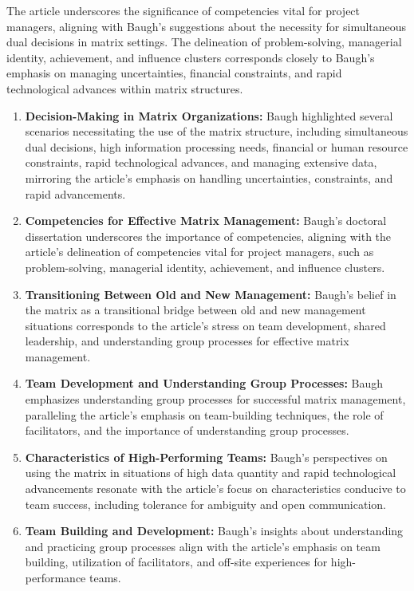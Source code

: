 \documentclass[runningheads]{llncs}
\begin{document}
The article underscores the significance of competencies vital for project managers, aligning with Baugh's suggestions about the necessity for simultaneous dual decisions in matrix settings. The delineation of problem-solving, managerial identity, achievement, and influence clusters corresponds closely to Baugh's emphasis on managing uncertainties, financial constraints, and rapid technological advances within matrix structures.
\begin{enumerate}
    \item \textbf{Decision-Making in Matrix Organizations:} Baugh highlighted several scenarios necessitating the use of the matrix structure, including simultaneous dual decisions, high information processing needs, financial or human resource constraints, rapid technological advances, and managing extensive data, mirroring the article's emphasis on handling uncertainties, constraints, and rapid advancements.
    
    \item \textbf{Competencies for Effective Matrix Management:} Baugh's doctoral dissertation underscores the importance of competencies, aligning with the article's delineation of competencies vital for project managers, such as problem-solving, managerial identity, achievement, and influence clusters.
    
    \item \textbf{Transitioning Between Old and New Management:} Baugh's belief in the matrix as a transitional bridge between old and new management situations corresponds to the article's stress on team development, shared leadership, and understanding group processes for effective matrix management.
    
    \item \textbf{Team Development and Understanding Group Processes:} Baugh emphasizes understanding group processes for successful matrix management, paralleling the article's emphasis on team-building techniques, the role of facilitators, and the importance of understanding group processes.
    
    \item \textbf{Characteristics of High-Performing Teams:} Baugh's perspectives on using the matrix in situations of high data quantity and rapid technological advancements resonate with the article's focus on characteristics conducive to team success, including tolerance for ambiguity and open communication.
    
    \item \textbf{Team Building and Development:} Baugh's insights about understanding and practicing group processes align with the article's emphasis on team building, utilization of facilitators, and off-site experiences for high-performance teams.
    

\end{enumerate}
\end{document}

